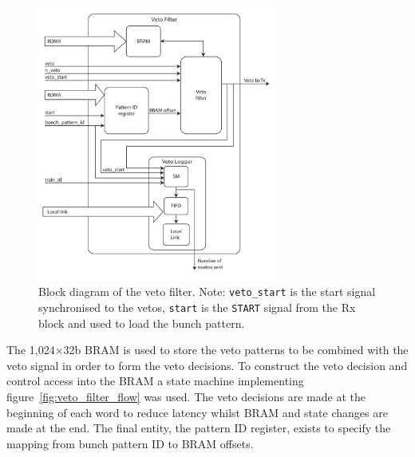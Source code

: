 \begin{figure}[htbp]
  \centering
  \includegraphics[width=0.7\textwidth]{images/pdfs/veto_filter_block.pdf}
  \caption{Block diagram of the veto filter. Note: \texttt{veto\_start} is the start signal synchronised to the vetos, \texttt{start} is the \texttt{START} signal from the Rx block and used to load the bunch pattern.}
  \label{fig:veto_filter_entity}
\end{figure}
    
The  1,024\( \times \)32b BRAM is used to store the veto patterns to be combined with the veto signal in order to form the veto decisions. To construct the veto decision and control access into the BRAM a state machine implementing figure~\ref{fig:veto_filter_flow} was used. The veto decisions are made at the beginning of each word to reduce latency whilst BRAM and state changes are made at the end. The final entity, the pattern ID register, exists to specify the mapping from bunch pattern ID to BRAM offsets.
    
